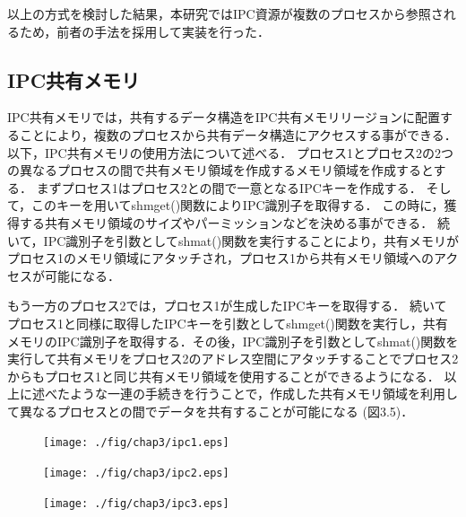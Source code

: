 以上の方式を検討した結果，本研究ではIPC資源が複数のプロセスから参照されるため，前者の手法を採用して実装を行った．

\subsection*{IPC共有メモリ}

IPC共有メモリでは，共有するデータ構造をIPC共有メモリリージョンに配置することにより，複数のプロセスから共有データ構造にアクセスする事ができる．
以下，IPC共有メモリの使用方法について述べる．
プロセス1とプロセス2の2つの異なるプロセスの間で共有メモリ領域を作成するメモリ領域を作成するとする．
まずプロセス1はプロセス2との間で一意となるIPCキーを作成する．
そして，このキーを用いてshmget()関数によりIPC識別子を取得する．
この時に，獲得する共有メモリ領域のサイズやパーミッションなどを決める事ができる．
続いて，IPC識別子を引数としてshmat()関数を実行することにより，共有メモリがプロセス1のメモリ領域にアタッチされ，プロセス1から共有メモリ領域へのアクセスが可能になる．

もう一方のプロセス2では，プロセス1が生成したIPCキーを取得する．
続いてプロセス1と同様に取得したIPCキーを引数としてshmget()関数を実行し，共有メモリのIPC識別子を取得する．その後，IPC識別子を引数としてshmat()関数を実行して共有メモリをプロセス2のアドレス空間にアタッチすることでプロセス2からもプロセス1と同じ共有メモリ領域を使用することができるようになる．
以上に述べたような一連の手続きを行うことで，作成した共有メモリ領域を利用して異なるプロセスとの間でデータを共有することが可能になる (図3.5)．

\begin{figure}[H]
    \hspace*{\fill}
    \texttt{[image: ./fig/chap3/ipc1.eps]}
    \hspace*{\fill}
    
\end{figure}

\begin{figure}[H]
    \hspace*{\fill}
    \texttt{[image: ./fig/chap3/ipc2.eps]}
    \hspace*{\fill}
\end{figure}


\begin{figure}[H]
    \hspace*{\fill}
    \texttt{[image: ./fig/chap3/ipc3.eps]}
    \hspace*{\fill}
\end{figure}

